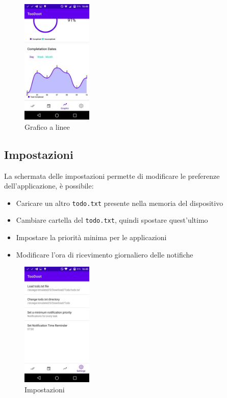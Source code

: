 \documentclass[]{article}
\providecommand{\tightlist}{%
  \setlength{\itemsep}{0pt}\setlength{\parskip}{0pt}}
\begin{document}
\begin{figure}
\centering
\includegraphics[width=0.3\textwidth,height=0.1\textheight]{./img/grafico_linee.jpg}
\caption{Grafico a linee}
\end{figure}

\hypertarget{impostazioni}{%
\subsection{Impostazioni}\label{impostazioni}}

La schermata delle impostazioni permette di modificare le preferenze
dell'applicazione, è possibile:

\begin{itemize}
\tightlist
\item
  Caricare un altro \texttt{todo.txt} presente nella memoria del
  dispositivo
\item
  Cambiare cartella del \texttt{todo.txt}, quindi spostare quest'ultimo
\item
  Impostare la priorità minima per le applicazioni
\item
  Modificare l'ora di ricevimento giornaliero delle notifiche
\end{itemize}

\begin{figure}
\centering
\includegraphics[width=0.3\textwidth,height=0.1\textheight]{./img/impostazioni.jpg}
\caption{Impostazioni}
\end{figure}
\end{document}
